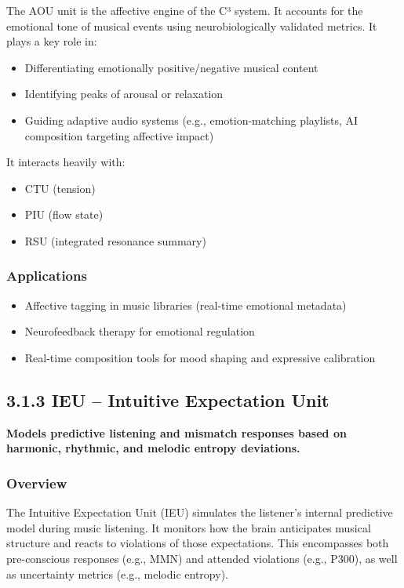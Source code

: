 The AOU unit is the affective engine of the C³ system. It accounts for the emotional tone of musical events using neurobiologically validated metrics. It plays a key role in:

\begin{itemize}
    \item Differentiating emotionally positive/negative musical content
    \item Identifying peaks of arousal or relaxation
    \item Guiding adaptive audio systems (e.g., emotion-matching playlists, AI composition targeting affective impact)
\end{itemize}

It interacts heavily with:

\begin{itemize}
    \item CTU (tension)
    \item PIU (flow state)
    \item RSU (integrated resonance summary)
\end{itemize}

\subsubsection*{Applications}

\begin{itemize}
    \item Affective tagging in music libraries (real-time emotional metadata)
    \item Neurofeedback therapy for emotional regulation
    \item Real-time composition tools for mood shaping and expressive calibration
\end{itemize}

\subsection*{3.1.3 IEU – Intuitive Expectation Unit}

\textbf{Models predictive listening and mismatch responses based on harmonic, rhythmic, and melodic entropy deviations.}

\subsubsection*{Overview}

The Intuitive Expectation Unit (IEU) simulates the listener’s internal predictive model during music listening. It monitors how the brain anticipates musical structure and reacts to violations of those expectations. This encompasses both pre-conscious responses (e.g., MMN) and attended violations (e.g., P300), as well as uncertainty metrics (e.g., melodic entropy).

